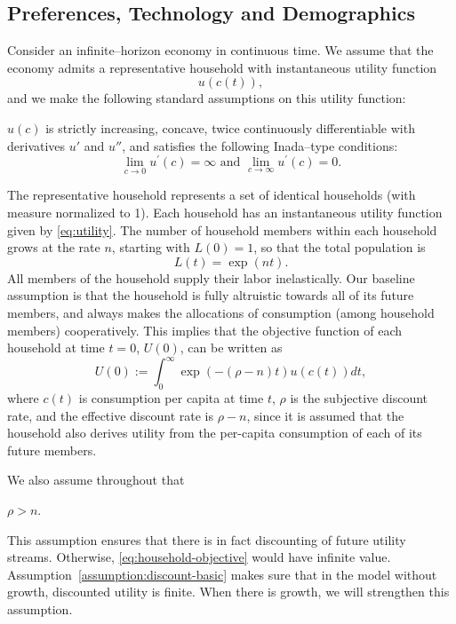 \documentclass[\topdir/lecture\_notes.tex]{subfiles}
\begin{document}
\subsection{Preferences, Technology and Demographics}
Consider an infinite--horizon economy in continuous time.
We assume that the economy admits a representative household with instantaneous utility function
\begin{equation}
  u(c(t)),
  \label{eq:utility}
\end{equation}
and we make the following standard assumptions on this utility function:
\begin{assumption}
  \label{assumption:utility}
  \(u(c)\) is strictly increasing, concave, twice continuously differentiable with derivatives \(u'\) and \(u''\), and satisfies the following Inada--type conditions:
  \[
    \lim _{c \rightarrow 0} u^{\prime}(c)=\infty \text { and } \lim _{c \rightarrow \infty} u^{\prime}(c)=0.
  \]
\end{assumption}
The representative household represents a set of identical households (with measure normalized to 1).
Each household has an instantaneous utility function given by \eqref{eq:utility}.
The number of household members within each household grows at the rate \(n\), starting with \(L(0)=1\), so that the total population is
\begin{equation*}
  L(t)=\exp(nt).
\end{equation*}
All members of the household supply their labor inelastically.
Our baseline assumption is that the household is fully altruistic towards all of its future members, and always makes the allocations of consumption (among household members) cooperatively.
This implies that the objective function of each household at time \(t=0\), \(U(0)\), can be written as
\begin{equation}
  U(0) := \int_{0}^{\infty} \exp(-(\rho-n) t) u(c(t)) dt,
  \label{eq:household-objective}
\end{equation}
where \(c(t)\) is consumption per capita at time \(t\), \(\rho\) is the subjective discount rate, and the effective discount rate is \(\rho-n\), since it is assumed that the household also derives utility from the per-capita consumption of each of its future members.

We also assume throughout that
\begin{assumption}
  \label{assumption:discount-basic}
  \(\rho>n\).
\end{assumption}
This assumption ensures that there is in fact discounting of future utility streams.
Otherwise, \eqref{eq:household-objective} would have infinite value.
Assumption~\ref{assumption:discount-basic} makes sure that in the model without growth, discounted utility is finite.
When there is growth, we will strengthen this assumption.
\end{document}
